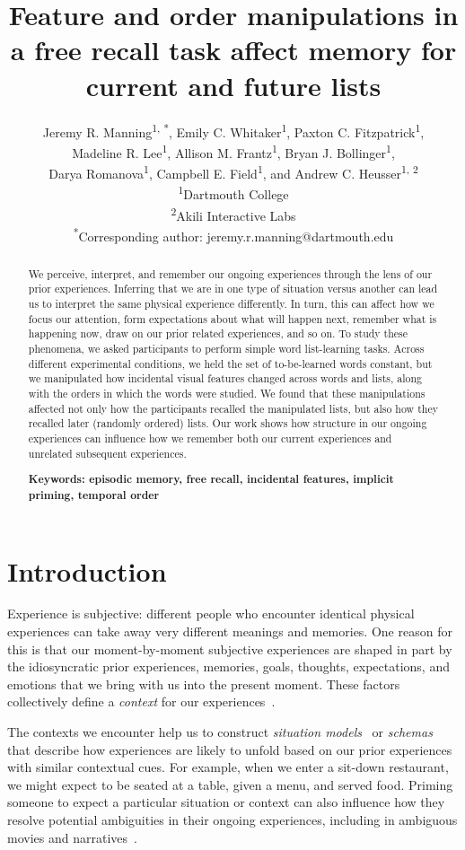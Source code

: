 \documentclass[11pt]{article}
\title{\Large Feature and order manipulations in a free recall task affect memory for current and future lists}
\author{Jeremy R. Manning\textsuperscript{1, *}, Emily C.
Whitaker\textsuperscript{1}, Paxton C. Fitzpatrick\textsuperscript{1},
\\Madeline R. Lee\textsuperscript{1}, Allison M. Frantz\textsuperscript{1},
Bryan J. Bollinger\textsuperscript{1},\\Darya Romanova\textsuperscript{1},
Campbell E. Field\textsuperscript{1}, and Andrew C. Heusser\textsuperscript{1,
2}\\\textsuperscript{1}Dartmouth College\\\textsuperscript{2}Akili
Interactive Labs\\\textsuperscript{*}Corresponding author:
jeremy.r.manning@dartmouth.edu}
\date{}
\begin{document}
\maketitle
\thispagestyle{empty}

\begin{abstract} \footnotesize{We perceive, interpret, and remember our ongoing
experiences through the lens of our prior experiences. Inferring that we are in
one type of situation versus another can lead us to interpret the same physical
experience differently. In turn, this can affect how we focus our attention,
form expectations about what will happen next, remember what is happening now,
draw on our prior related experiences, and so on. To study these phenomena, we
asked participants to perform simple word list-learning tasks. Across different
experimental conditions, we held the set of to-be-learned words constant, but
we manipulated how incidental visual features changed across words and lists,
along with the orders in which the words were studied. We found that these
manipulations affected not only how the participants recalled the manipulated
lists, but also how they recalled later (randomly ordered) lists. Our work
shows how structure in our ongoing experiences can influence how we remember
both our current experiences and unrelated subsequent experiences.

\textbf{Keywords: episodic memory, free recall, incidental features, implicit
priming, temporal order}}

\end{abstract}


\section*{Introduction}


Experience is subjective: different people who encounter identical physical
experiences can take away very different meanings and memories. One reason for this is
that our moment-by-moment subjective experiences are shaped in part by the
idiosyncratic prior experiences, memories, goals, thoughts, expectations, and
emotions that we bring with us into the present moment. These factors
collectively define a \textit{context} for our experiences~\citep{Mann20}.


The contexts we encounter help us to construct \textit{situation
models}~\citep{RangRitc12, MannEtal15, RadvCope06, ZwaaEtal95, ZwaaRadv98} or
\textit{schemas}~\citep{MasiEtal22, BaldEtal18, TseEtal07} that describe how
experiences are likely to unfold based on our prior experiences with similar
contextual cues. For example, when we enter a sit-down restaurant, we might
expect to be seated at a table, given a menu, and served food. Priming someone
to expect a particular situation or context can also influence how they resolve
potential ambiguities in their ongoing experiences, including in ambiguous
movies and narratives~\citep{YeshEtal17, RissEtal03}.
\end{document}
